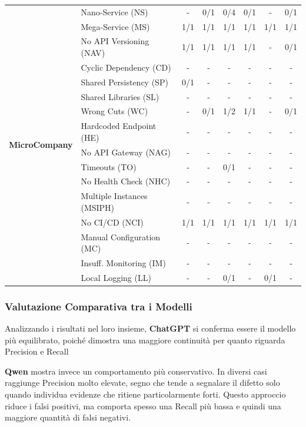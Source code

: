 \begin{table}[H]
\begin{tabular}{| c | l | c c | c c | c c |}
        \multirow{16}{*}{\textbf{MicroCompany}} 
        & Nano-Service (NS)           & - & 0/1 & 0/4 & 0/1 & - & 0/1 \\
        & Mega-Service (MS)           & 1/1 & 1/1 & 1/1 & 1/1 & 1/1 & 1/1 \\
        & No API Versioning (NAV)     & 1/1 & 1/1 & 1/1 & 1/1 & - & 0/1 \\
        & Cyclic Dependency (CD)      & - & - & - & - & - & - \\
        & Shared Persistency (SP)     & 0/1 & - & - & - & - & - \\
        & Shared Libraries (SL)       & - & - & - & - & - & - \\
        & Wrong Cuts (WC)             & - & 0/1 & 1/2 & 1/1 & - & 0/1 \\
        & Hardcoded Endpoint (HE)     & - & - & - & - & - & - \\
        & No API Gateway (NAG)        & - & - & - & - & - & - \\
        & Timeouts (TO)               & - & - & 0/1 & - & - & - \\
        & No Health Check (NHC)       & - & - & - & - & - & - \\
        & Multiple Instances (MSIPH)  & - & - & - & - & - & - \\
        & No CI/CD (NCI)              & 1/1 & 1/1 & 1/1 & 1/1 & 1/1 & 1/1 \\
        & Manual Configuration (MC)   & - & - & - & - & - & - \\
        & Insuff. Monitoring (IM)     & - & - & - & - & - & - \\
        & Local Logging (LL)          & - & - & 0/1 & - & 0/1 & - \\ \hline
    \end{tabular}
\end{table}
\vspace{1em}

\subsubsection*{Valutazione Comparativa tra i Modelli}

Analizzando i risultati nel loro insieme, \textbf{ChatGPT} si conferma essere il modello più equilibrato, poiché dimostra una maggiore continuità per quanto riguarda Precision e Recall

\textbf{Qwen} mostra invece un comportamento più conservativo. In diversi casi raggiunge Precision molto elevate, segno che tende a segnalare il difetto solo quando individua evidenze che ritiene particolarmente forti. Questo approccio riduce i falsi positivi, ma comporta spesso una Recall più bassa e quindi una maggiore quantità di falsi negativi.

